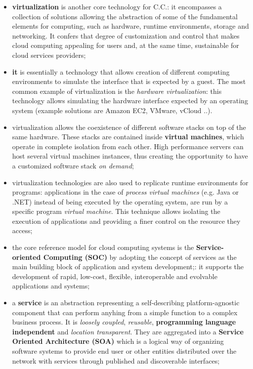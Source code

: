 \documentclass[oneside]{article}
\begin{document}
\begin{itemize}
    \item \textbf{virtualization} is another core technology for C.C.: it encompasses a collection of solutions allowing the abstraction of some of the fundamental elements for computing, such as hardware, runtime environments, storage and networking. It confers that degree of customization and control that makes cloud computing appealing for users and, at the same time, sustainable for cloud services providers;
    
    \item \textbf{it} is essentially a technology that allows creation of different computing environments to simulate the interface that is expected by a guest. The most common example of virtualization is the \textit{hardware virtualization}: this technology allows simulating the hardware interface expected by an operating system (example solutions are Amazon EC2, VMware, vCloud ..).
    
    \item virtualization allows the coexistence of different software stacks on top of the same hardware. These stacks are contained inside \textbf{virtual machines}, which operate in complete isolation from each other. High performance servers can host several virtual machines instances, thus creating the opportunity to have a customized software stack \textit{on demand};
    
    \item virtualization technologies are also used to replicate runtime environments for programs: applications in the case of \textit{process virtual machines} (e.g. Java or .NET) instead of being executed by the operating system, are run by a specific program \textit{virtual machine}. This technique allows isolating the execution of applications and providing a finer control on the resource they access;
    
    \item the core reference model for cloud computing systems is the \textbf{Service-oriented Computing (SOC)} by adopting the concept of services as the main building block of application and system development;: it supports the development of rapid, low-cost, flexible, interoperable and evolvable applications and systems;
    
    \item a \textbf{service} is an abstraction representing a self-describing platform-agnostic component that can perform anyhing from a simple function to a complex business process. It is \textit{loosely coupled}, \textit{reusable}, \textbf{programming language independent} and \textit{location transparent}. They are aggregated into a \textbf{Service Oriented Architecture (SOA)} which is a logical way of organizing software systems to provide end user or other entities distributed over the network  with services through published and discoverable interfaces;
    

\end{itemize}
\end{document}
